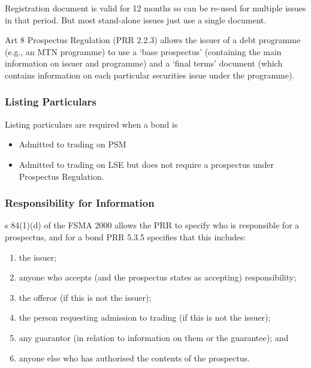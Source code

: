 \documentclass[
]{article}
\providecommand{\tightlist}{%
  \setlength{\itemsep}{0pt}\setlength{\parskip}{0pt}}
\begin{document}
Registration document is valid for 12 months so can be re-used for
multiple issues in that period. But most stand-alone issues just use a
single document.

Art 8 Prospectus Regulation (PRR 2.2.3) allows the issuer of a debt
programme (e.g., an MTN programme) to use a `base prospectus'
(containing the main information on issuer and programme) and a `final
terms' document (which contains information on each particular
securities issue under the programme).

\hypertarget{listing-particulars}{%
\subsubsection{Listing Particulars}\label{listing-particulars}}

Listing particulars are required when a bond is

\begin{itemize}
\tightlist
\item
  Admitted to trading on PSM
\item
  Admitted to trading on LSE but does not require a prospectus under
  Prospectus Regulation.
\end{itemize}

\hypertarget{responsibility-for-information}{%
\subsubsection{Responsibility for
Information}\label{responsibility-for-information}}

s 84(1)(d) of the FSMA 2000 allows the PRR to specify who is responsible
for a prospectus, and for a bond PRR 5.3.5 specifies that this includes:

\begin{enumerate}
\tightlist
\item
  the issuer;
\item
  anyone who accepts (and the prospectus states as accepting)
  responsibility;
\item
  the offeror (if this is not the issuer);
\item
  the person requesting admission to trading (if this is not the
  issuer);
\item
  any guarantor (in relation to information on them or the guarantee);
  and
\item
  anyone else who has authorised the contents of the prospectus.
\end{enumerate}
\end{document}
